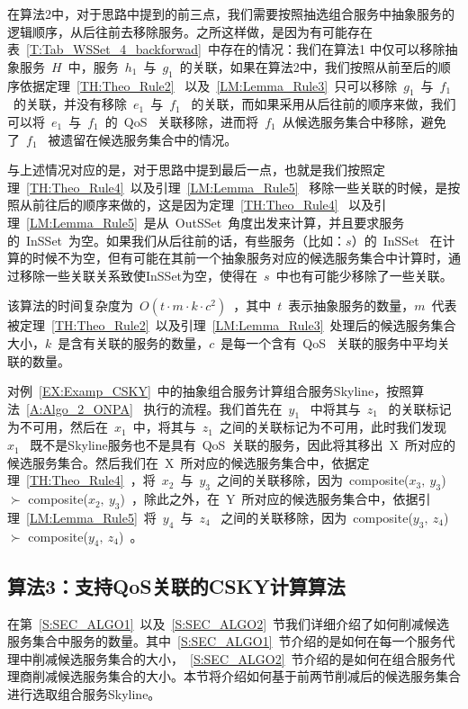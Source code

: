 在算法2中，对于思路中提到的前三点，我们需要按照抽选组合服务中抽象服务的逻辑顺序，从后往前去移除服务。之所这样做，是因为有可能存在表~\ref{T:Tab_WSSet_4_backforwad}~中存在的情况：我们在算法1 中仅可以移除抽象服务~$H$~中，服务~$h_{1}$~与~$g_{1}$~的关联，如果在算法2中，我们按照从前至后的顺序依据定理~\ref{TH:Theo_Rule2}~ 以及~\ref{LM:Lemma_Rule3}~只可以移除~$g_{1}$~与~$f_{1}$~的关联，并没有移除~$e_{1}$~与~$f_{1}$~ 的关联，而如果采用从后往前的顺序来做，我们可以将~$e_{1}$~与~$f_{1}$~的~QoS~ 关联移除，进而将~$f_{1}$~从候选服务集合中移除，避免了~$f_{1}$~ 被遗留在候选服务集合中的情况。

与上述情况对应的是，对于思路中提到最后一点，也就是我们按照定理~\ref{TH:Theo_Rule4}~以及引理~\ref{LM:Lemma_Rule5}~ 移除一些关联的时候，是按照从前往后的顺序来做的，这是因为定理~\ref{TH:Theo_Rule4}~ 以及引理~\ref{LM:Lemma_Rule5}~是从~OutSSet~角度出发来计算，并且要求服务的~InSSet~为空。如果我们从后往前的话，有些服务（比如：$s$）的~InSSet~ 在计算的时候不为空，但有可能在其前一个抽象服务对应的候选服务集合中计算时，通过移除一些关联关系致使InSSet为空，使得在~$s$~中也有可能少移除了一些关联。

该算法的时间复杂度为~$O(t \cdot m \cdot k \cdot c^{2})$~，其中~$t$~表示抽象服务的数量，$m$~代表被定理~\ref{TH:Theo_Rule2}~以及引理~\ref{LM:Lemma_Rule3}~处理后的候选服务集合大小，$k$~是含有关联的服务的数量，$c$~是每一个含有~QoS~ 关联的服务中平均关联的数量。

对例~\ref{EX:Examp_CSKY}~中的抽象组合服务计算组合服务Skyline，按照算法~\ref{A:Algo_2_ONPA}~ 执行的流程。我们首先在~$y_{1}$~ 中将其与~$z_{1}$~ 的关联标记为不可用，然后在~$x_{1}$~中，将其与~$z_{1}$~之间的关联标记为不可用，此时我们发现~$x_{1}$~ 既不是Skyline服务也不是具有~QoS~关联的服务，因此将其移出~X~所对应的候选服务集合。然后我们在~X~所对应的候选服务集合中，依据定理~\ref{TH:Theo_Rule4}~，将~$x_{2}$~与~$y_{3}$~之间的关联移除，因为~composite($x_{3},\ y_{3}$) $\succ$ composite($x_{2},\ y_{3}$)~，除此之外，在~Y~所对应的候选服务集合中，依据引理~\ref{LM:Lemma_Rule5}~将~$y_{4}$~与~$z_{4}$~ 之间的关联移除，因为~composite($y_{3},\ z_{4}$) $\succ$ composite($y_{4},\ z_{4}$)~。

\subsection{算法3：支持QoS关联的CSKY计算算法}\label{S:SEC_ALGO3}

在第~\ref{S:SEC_ALGO1}~以及~\ref{S:SEC_ALGO2}~节我们详细介绍了如何削减候选服务集合中服务的数量。其中~\ref{S:SEC_ALGO1}~节介绍的是如何在每一个服务代理中削减候选服务集合的大小，~\ref{S:SEC_ALGO2}~节介绍的是如何在组合服务代理商削减候选服务集合的大小。本节将介绍如何基于前两节削减后的候选服务集合进行选取组合服务Skyline。

